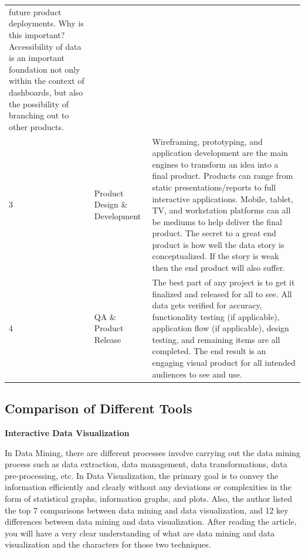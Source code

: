 \documentclass[]{book}
\theoremstyle{definition}
\theoremstyle{definition}
\theoremstyle{definition}
\theoremstyle{remark}
\begin{document}
\begin{longtable}[]{@{}lll@{}}
\begin{minipage}[t]{0.76\columnwidth}
future product deployments. Why is this important? Accessibility of data
is an important foundation not only within the context of dashboards,
but also the possibility of branching out to other products.\strut
\end{minipage}\tabularnewline
\begin{minipage}[t]{0.04\columnwidth}\raggedright\strut
3\strut
\end{minipage} & \begin{minipage}[t]{0.11\columnwidth}\raggedright\strut
Product Design \& Development\strut
\end{minipage} & \begin{minipage}[t]{0.76\columnwidth}\raggedright\strut
Wireframing, prototyping, and application development are the main
engines to transform an idea into a final product. Products can range
from static presentations/reports to full interactive applications.
Mobile, tablet, TV, and workstation platforms can all be mediums to help
deliver the final product. The secret to a great end product is how well
the data story is conceptualized. If the story is weak then the end
product will also suffer.\strut
\end{minipage}\tabularnewline
\begin{minipage}[t]{0.04\columnwidth}\raggedright\strut
4\strut
\end{minipage} & \begin{minipage}[t]{0.11\columnwidth}\raggedright\strut
QA \& Product Release\strut
\end{minipage} & \begin{minipage}[t]{0.76\columnwidth}\raggedright\strut
The best part of any project is to get it finalized and released for all
to see. All data gets verified for accuracy, functionality testing (if
applicable), application flow (if applicable), design testing, and
remaining items are all completed. The end result is an engaging visual
product for all intended audiences to see and use.\strut
\end{minipage}\tabularnewline
\bottomrule
\end{longtable}

\subsection{Comparison of Different
Tools}\label{comparison-of-different-tools}

\textbf{Interactive Data Visualization}

In Data Mining, there are different processes involve carrying out the
data mining process such as data extraction, data management, data
transformations, data pre-processing, etc. In Data Visualization, the
primary goal is to convey the information efficiently and clearly
without any deviations or complexities in the form of statistical
graphs, information graphs, and plots. Also, the author listed the top 7
comparisons between data mining and data visualization, and 12 key
differences between data mining and data visualization. After reading
the article, you will have a very clear understanding of what are data
mining and data visualization and the characters for those two
techniques.
\end{document}
